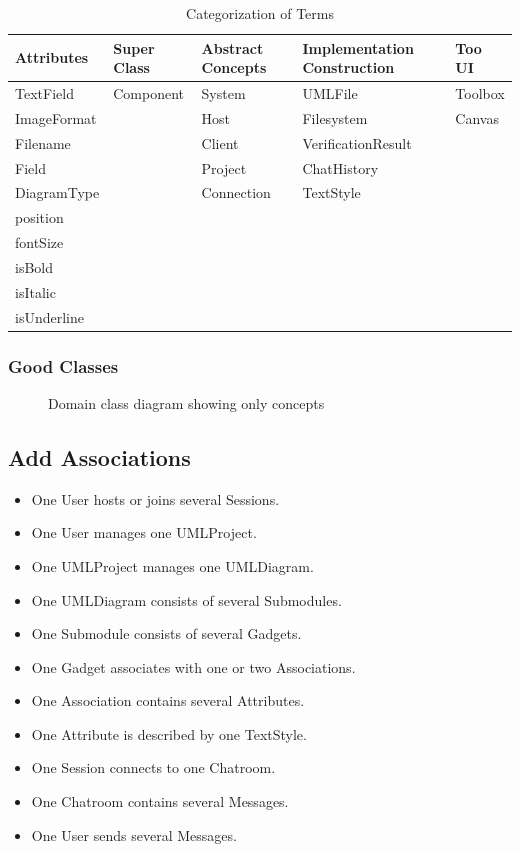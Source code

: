 \documentclass[12pt]{article}
\begin{document}
\begin{table}[h]
    \centering
    \caption{Categorization of Terms}
    \begin{tabular}{l l l ll}
        \toprule
        \textbf{Attributes} & \textbf{Super Class} & \textbf{Abstract Concepts} & \textbf{Implementation Construction}  & \textbf{Too UI}\\ 
        \midrule
        TextField & Component & System & UMLFile  &Toolbox\\
        ImageFormat &  & Host & Filesystem  &Canvas\\
        Filename &  & Client & VerificationResult  &\\
        Field &  & Project & ChatHistory  &\\
        DiagramType &  & Connection & TextStyle  &\\
        position &  &  &   &\\
        fontSize &  &  &   &\\
        isBold &  &  &   &\\
        isItalic &  &  &   &\\
        isUnderline &  &  &   &\\ 
        \bottomrule
    \end{tabular}
    \label{tab:categories}
\end{table}



\subsubsection{Good Classes}

\begin{figure}[H]
  \centering
    
  \caption{Domain class diagram showing only concepts}  
\end{figure}

\subsection{Add Associations}
\begin{itemize}
    \item One User hosts or joins several Sessions.
    \item One User manages one UMLProject.
    \item One UMLProject manages one UMLDiagram.
    \item One UMLDiagram consists of several Submodules.
    \item One Submodule consists of several Gadgets.
    \item One Gadget associates with one or two Associations.
    \item One Association contains several Attributes.
    \item One Attribute is described by one TextStyle.
    \item One Session connects to one Chatroom.
    \item One Chatroom contains several Messages.
    \item One User sends several Messages.
\end{itemize}
\end{document}
